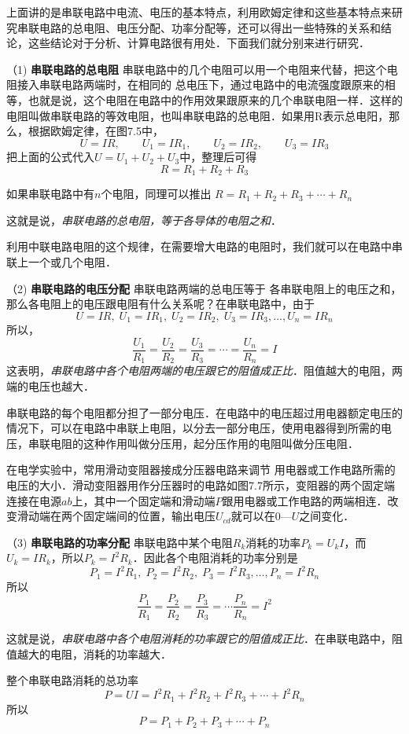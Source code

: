 上面讲的是串联电路中电流、电压的基本特点，利用欧姆定律和这些基本特点来研究串联电路的总电阻、电压分配、功率分配等，还可以得出一些特殊的关系和结论，这些结论对于分析、计算电路很有用处．下面我们就分别来进行研究．

（1) \textbf{串联电路的总电阻 } 串联电路中的几个电阻可以用一个电阻来代替，把这个电阻接入串联电路两端时，在相同的
总电压下，通过电路中的电流强度跟原来的相等，也就是说，这个电阻在电路中的作用效果跟原来的几个串联电阻一样．这样的电阻叫做串联电路的等效电阻，也叫串联电路的总电阻．如果用R表示总电阳，那么，根据欧姆定律，在图7.5中，
\[U=IR,\qquad  U_1=IR_1,\qquad U_2=IR_2,\qquad U_3=IR_3\]
把上面的公式代入$U=U_1+U_2+U_3$中，整理后可得
\[R=R_1+R_2+R_3\]

如果串联电路中有$n$个电阻，同理可以推出
$R=R_1+R_2+R_3+\cdots+R_n$

这就是说，\textit{串联电路的总电阻，等于各导体的电阻之和}．

利用中联电路电阻的这个规律，在需要增大电路的电阻时，我们就可以在电路中串联上一个或几个电阻．

（2) \textbf{串联电路的电压分配 } 串联电路两端的总电压等于
各串联电阻上的电压之和，那么各电阻上的电压跟电阻有什么关系呢？在串联电路中，由于
\[U=IR,\;  U_1=IR_1,\; U_2=IR_2,\; U_3=IR_3,\ldots, U_n=IR_n\]
所以，
\[\frac{U_1}{R_1}=\frac{U_2}{R_2}=\frac{U_3}{R_3}=\cdots=\frac{U_n}{R_n}=I \]
这表明，\textit{串联电路中各个电阻两端的电压跟它的阻值成正比}．阻值越大的电阻，两端的电压也越大．

串联电路的每个电阻都分担了一部分电压．在电路中的电压超过用电器额定电压的情况下，可以在电路中串联上电阻，以分去一部分电压，使用电器得到所需的电压，串联电阻的这种作用叫做分压用，起分压作用的电阻叫做分压电阻．

在电学实验中，常用滑动变阻器接成分压器电路来调节
用电器或工作电路所需的电压的大小．滑动变阻器用作分压器时的电路如图7.7所示，变阻器的两个固定端连接在电源$ab$上，其中一个固定端和滑动端$P$跟用电器或工作电路的两端相连．改变滑动端在两个固定端间的位置，输出电压$U_{cd}$就可以在0—$U$之间变化．

（3) \textbf{串联电路的功率分配 } 串联电路中某个电阻$R_k$消耗的功率$P_k=U_kI$，而$U_k=IR_k$，所以$P_k=I^2R_k$．因此各个电阻消耗的功率分别是
\[P_1=I^2R_1,\; P_2=I^2R_2,\; P_3=I^2R_3,\ldots, P_n=I^2R_n\]
所以
\[\frac{P_1}{R_1}=\frac{P_2}{R_2}=\frac{P_3}{R_3}=\cdots\frac{P_n}{R_n}=I^2 \]

这就是说，\textit{串联电路中各个电阻消耗的功率跟它的阻值成正比}．在串联电路中，阻值越大的电阻，消耗的功率越大．

整个串联电路消耗的总功率
\[P=UI=I^2R_1 +I^2R_2+I^2R_3+\cdots+I^2R_n
\]
所以
\[P=P_1+P_2+P_3+\cdots +P_n\]


